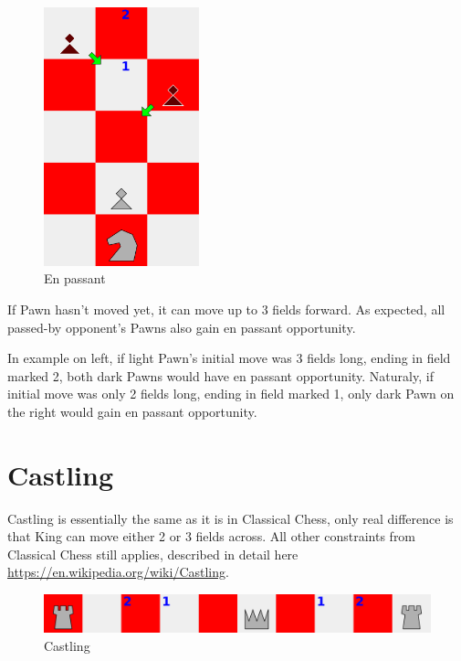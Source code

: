 \documentclass[a5paper,12pt,draft]{book} %
\begin{document}
\noindent
\begin{figure}
\includegraphics[width=0.4\textwidth, keepaspectratio=true]{../gfx/en_passants/04_croatian_ties_en_passant.png}
\caption{En passant}
\label{fig:cc_en_passant}
\end{figure}
\indent
If Pawn hasn't moved yet, it can move up to 3 fields forward. As expected, all passed-by
opponent's Pawns also gain en passant opportunity.

In example on left, if light Pawn's
initial move was 3 fields long, ending in field marked 2, both dark Pawns would have en
passant opportunity. Naturaly, if initial move was only 2 fields long, ending in field
marked 1, only dark Pawn on the right would gain en passant opportunity.

\clearpage

\section*{Castling}

\indent
Castling is essentially the same as it is in Classical Chess, only real difference is that
King can move either 2 or 3 fields across. All other constraints from Classical Chess still
applies, described in detail here \\
\href{https://en.wikipedia.org/wiki/Castling}{https://en.wikipedia.org/wiki/Castling}.

\noindent
\begin{figure}[!h]
\includegraphics[width=1.0\textwidth, keepaspectratio=true]{../gfx/castlings/04_croatian_ties_castling.png}
\caption{Castling}
\label{fig:cc_castling}
\end{figure}
\end{document}
